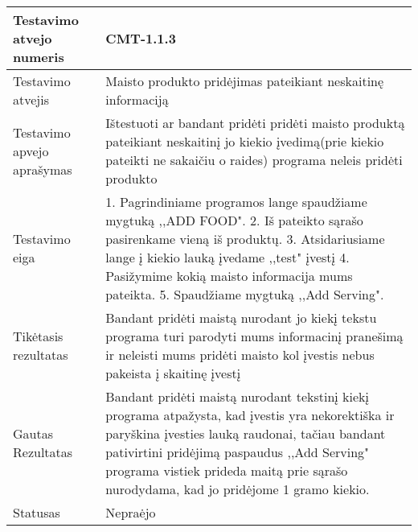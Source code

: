 \documentclass[oneside]{VUMIFPSkursinis}
\begin{document}
\begin{center}
    \begin{tabular}{ |p{5cm}|p{13cm}|}
    \hline
    	Testavimo atvejo numeris & CMT-1.1.3 \\ \hline
    	Testavimo atvejis & Maisto produkto pridėjimas pateikiant neskaitinę informaciją \\ \hline
	Testavimo apvejo aprašymas & Ištestuoti ar bandant pridėti pridėti maisto produktą pateikiant neskaitinį jo kiekio įvedimą(prie kiekio pateikti ne sakaičiu o raides) programa neleis pridėti produkto  \\ \hline
	Testavimo eiga & 1. Pagrindiniame programos lange spaudžiame mygtuką ,,ADD FOOD". 
				2. Iš pateikto sąrašo pasirenkame vieną iš produktų. 
				3. Atsidariusiame lange į kiekio lauką įvedame ,,test" įvestį
				4. Pasižymime kokią maisto informacija mums pateikta.
				5. Spaudžiame mygtuką ,,Add Serving".\\ \hline
	Tikėtasis rezultatas & Bandant pridėti maistą nurodant jo kiekį tekstu programa turi parodyti mums informacinį pranešimą ir neleisti mums pridėti maisto kol įvestis nebus pakeista į skaitinę įvestį \\ \hline
	Gautas Rezultatas & Bandant pridėti maistą nurodant tekstinį kiekį programa atpažysta, kad įvestis yra nekorektiška ir paryškina įvesties lauką raudonai, tačiau bandant pativirtini pridėjimą paspaudus ,,Add Serving" programa vistiek prideda maitą prie sąrašo nurodydama, kad jo pridėjome 1 gramo kiekio. \\ \hline
	Statusas & Nepraėjo \\ \hline
    \hline
    \end{tabular}
\end{center}
\end{document}

